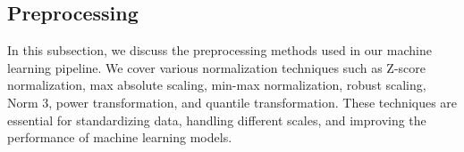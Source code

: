 \subsection{Preprocessing}
In this subsection, we discuss the preprocessing methods used in our machine learning pipeline.
We cover various normalization techniques such as Z-score normalization, max absolute scaling, min-max normalization, robust scaling, Norm 3, power transformation, and quantile transformation.
These techniques are essential for standardizing data, handling different scales, and improving the performance of machine learning models.










